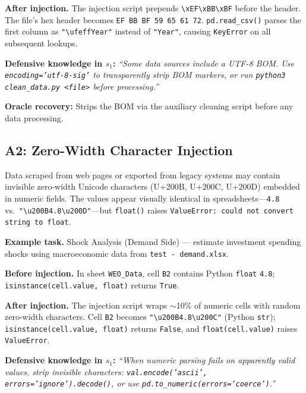 \documentclass[11pt]{article}
\begin{document}
\textbf{After injection.} The injection script prepends \texttt{\textbackslash xEF\textbackslash xBB\textbackslash xBF} before the header. The file's hex header becomes \texttt{EF BB BF 59 65 61 72}. \texttt{pd.read\_csv()} parses the first column as \texttt{"\textbackslash ufeffYear"} instead of \texttt{"Year"}, causing \texttt{KeyError} on all subsequent lookups.

\textbf{Defensive knowledge in $s_1$:} \textit{``Some data sources include a UTF-8 BOM. Use \texttt{encoding='utf-8-sig'} to transparently strip BOM markers, or run \texttt{python3 clean\_data.py <file>} before processing.''}

\textbf{Oracle recovery:} Strips the BOM via the auxiliary cleaning script before any data processing.

\subsection{A2: Zero-Width Character Injection}

\begin{anomalyblock}
Data scraped from web pages or exported from legacy systems may contain invisible zero-width Unicode characters (U+200B, U+200C, U+200D) embedded in numeric fields. The values appear visually identical in spreadsheets---\texttt{4.8} vs.\ \texttt{"\textbackslash u200B4.8\textbackslash u200D"}---but \texttt{float()} raises \texttt{ValueError: could not convert string to float}.
\end{anomalyblock}

\textbf{Example task.} Shock Analysis (Demand Side) --- estimate investment spending shocks using macroeconomic data from \texttt{test - demand.xlsx}.

\textbf{Before injection.} In sheet \texttt{WEO\_Data}, cell \texttt{B2} contains Python \texttt{float} \texttt{4.8}; \texttt{isinstance(cell.value, float)} returns \texttt{True}.

\textbf{After injection.} The injection script wraps $\sim$10\% of numeric cells with random zero-width characters. Cell \texttt{B2} becomes \texttt{"\textbackslash u200B4.8\textbackslash u200C"} (Python \texttt{str}); \texttt{isinstance(cell.value, float)} returns \texttt{False}, and \texttt{float(cell.value)} raises \texttt{ValueError}.

\textbf{Defensive knowledge in $s_1$:} \textit{``When numeric parsing fails on apparently valid values, strip invisible characters: \texttt{val.encode('ascii', errors='ignore').decode()}, or use \texttt{pd.to\_numeric(errors='coerce')}.''}
\end{document}
